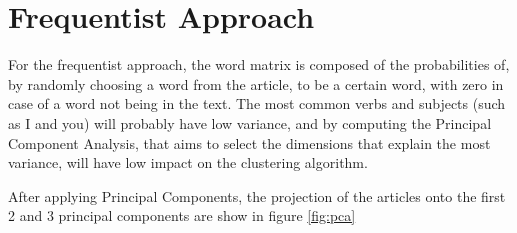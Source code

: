 \documentclass[a4paper,10pt]{article}
\begin{document}
\section{Frequentist Approach}
For the frequentist approach, the word matrix is composed of the probabilities of, by randomly choosing a word from the article, to be a certain word, with zero in case of a word not being in the text. The most common verbs and subjects (such as I and you) will probably have low variance, and by computing the Principal Component Analysis, that aims to select the dimensions that explain the most variance, will have low impact on the clustering algorithm. 

After applying Principal Components, the projection of the articles onto the first 2 and 3 principal components are show in figure \ref{fig:pca}
\end{document}
